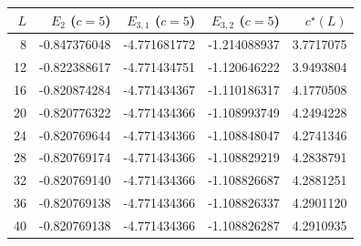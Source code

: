 \begin{tabular}{rrrrr}\toprule $L$ & $E_2$ ($c=5$) & $E_{3,1}$ ($c=5$) & $E_{3,2}$ ($c=5$) & $c^\star(L)$ \\ \midrule
8 & -0.847376048 & -4.771681772 & -1.214088937 & 3.7717075 \\
12 & -0.822388617 & -4.771434751 & -1.120646222 & 3.9493804 \\
16 & -0.820874284 & -4.771434367 & -1.110186317 & 4.1770508 \\
20 & -0.820776322 & -4.771434366 & -1.108993749 & 4.2494228 \\
24 & -0.820769644 & -4.771434366 & -1.108848047 & 4.2741346 \\
28 & -0.820769174 & -4.771434366 & -1.108829219 & 4.2838791 \\
32 & -0.820769140 & -4.771434366 & -1.108826687 & 4.2881251 \\
36 & -0.820769138 & -4.771434366 & -1.108826337 & 4.2901120 \\
40 & -0.820769138 & -4.771434366 & -1.108826287 & 4.2910935 \\
\bottomrule\end{tabular}
